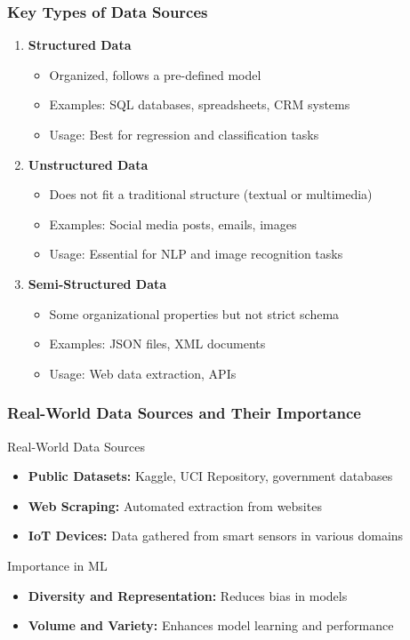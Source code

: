 \documentclass[aspectratio=169]{beamer}
\begin{document}
\begin{frame}[fragile]
    \frametitle{Key Types of Data Sources}
    \begin{enumerate}
        \item \textbf{Structured Data}
        \begin{itemize}
            \item Organized, follows a pre-defined model
            \item Examples: SQL databases, spreadsheets, CRM systems
            \item Usage: Best for regression and classification tasks
        \end{itemize}
        
        \item \textbf{Unstructured Data}
        \begin{itemize}
            \item Does not fit a traditional structure (textual or multimedia)
            \item Examples: Social media posts, emails, images
            \item Usage: Essential for NLP and image recognition tasks
        \end{itemize}
        
        \item \textbf{Semi-Structured Data}
        \begin{itemize}
            \item Some organizational properties but not strict schema
            \item Examples: JSON files, XML documents
            \item Usage: Web data extraction, APIs
        \end{itemize}
    \end{enumerate}
\end{frame}

\begin{frame}[fragile]
    \frametitle{Real-World Data Sources and Their Importance}
    \begin{block}{Real-World Data Sources}
        \begin{itemize}
            \item \textbf{Public Datasets:} Kaggle, UCI Repository, government databases
            \item \textbf{Web Scraping:} Automated extraction from websites
            \item \textbf{IoT Devices:} Data gathered from smart sensors in various domains
        \end{itemize}
    \end{block}

    \begin{block}{Importance in ML}
        \begin{itemize}
            \item \textbf{Diversity and Representation:} Reduces bias in models
            \item \textbf{Volume and Variety:} Enhances model learning and performance
        \end{itemize}
    \end{block}
\end{frame}
\end{document}
